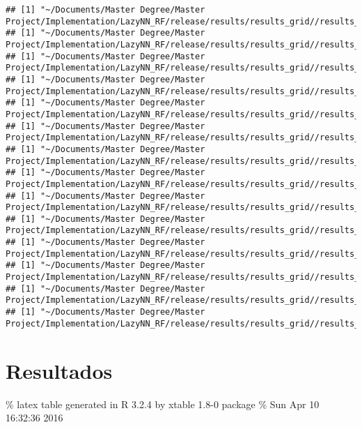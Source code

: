 \documentclass[]{article}
\begin{document}
\begin{verbatim}
## [1] "~/Documents/Master Degree/Master Project/Implementation/LazyNN_RF/release/results/results_grid//results_nb_4uni"
## [1] "~/Documents/Master Degree/Master Project/Implementation/LazyNN_RF/release/results/results_grid//results_nb_acm"
## [1] "~/Documents/Master Degree/Master Project/Implementation/LazyNN_RF/release/results/results_grid//results_nb_reuters90"
## [1] "~/Documents/Master Degree/Master Project/Implementation/LazyNN_RF/release/results/results_grid//results_rf_20ng"
## [1] "~/Documents/Master Degree/Master Project/Implementation/LazyNN_RF/release/results/results_grid//results_rf_4uni"
## [1] "~/Documents/Master Degree/Master Project/Implementation/LazyNN_RF/release/results/results_grid//results_rf_acm"
## [1] "~/Documents/Master Degree/Master Project/Implementation/LazyNN_RF/release/results/results_grid//results_rf_reuters90"
## [1] "~/Documents/Master Degree/Master Project/Implementation/LazyNN_RF/release/results/results_grid//results_svm_20ng"
## [1] "~/Documents/Master Degree/Master Project/Implementation/LazyNN_RF/release/results/results_grid//results_svm_4uni"
## [1] "~/Documents/Master Degree/Master Project/Implementation/LazyNN_RF/release/results/results_grid//results_svm_acm"
## [1] "~/Documents/Master Degree/Master Project/Implementation/LazyNN_RF/release/results/results_grid//results_svm_reuters90"
## [1] "~/Documents/Master Degree/Master Project/Implementation/LazyNN_RF/release/results/results_grid//results_xt_4uni"
## [1] "~/Documents/Master Degree/Master Project/Implementation/LazyNN_RF/release/results/results_grid//results_xt_acm"
## [1] "~/Documents/Master Degree/Master Project/Implementation/LazyNN_RF/release/results/results_grid//results_xt_reuters90"
\end{verbatim}

\section{Resultados}\label{resultados}

\% latex table generated in R 3.2.4 by xtable 1.8-0 package \% Sun Apr
10 16:32:36 2016
\end{document}
